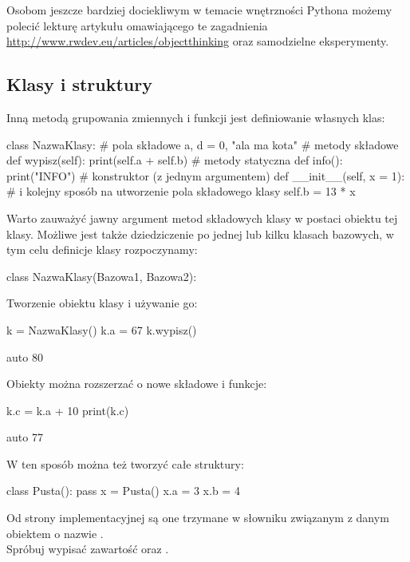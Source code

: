 \documentclass{pdfBooklets}
\begin{document}
Osobom jeszcze bardziej dociekliwym w temacie wnętrzności Pythona możemy polecić lekturę artykułu omawiającego te zagadnienia \url{http://www.rwdev.eu/articles/objectthinking} oraz samodzielne eksperymenty.

\subsection{Klasy i struktury {\Symbola 🤔}}

Inną metodą grupowania zmiennych i funkcji jest definiowanie własnych klas:
\begin{CodeFrame*}[python]{}
class NazwaKlasy:
  # pola składowe
  a, d = 0, "ala ma kota"
  # metody składowe
  def wypisz(self):
    print(self.a + self.b)
  # metody statyczna
  def info():
    print("INFO")
  # konstruktor (z jednym argumentem)
  def __init__(self, x = 1):
    # i kolejny sposób na utworzenie pola składowego klasy
    self.b = 13 * x
\end{CodeFrame*}
Warto zauważyć jawny argument metod składowych klasy w postaci obiektu tej klasy. 
Możliwe jest także dziedziczenie po jednej lub kilku klasach bazowych, w tym celu definicje klasy rozpoczynamy:
\begin{CodeFrame*}[python]{}
class NazwaKlasy(Bazowa1, Bazowa2):
\end{CodeFrame*}

Tworzenie obiektu klasy i używanie go:

\begin{CodeFrame}[python]{0.55\textwidth}
k = NazwaKlasy()
k.a = 67
k.wypisz()
\end{CodeFrame}
\begin{CodeFrame}{auto}
80
\end{CodeFrame}

Obiekty można rozszerzać o nowe składowe i funkcje:

\begin{CodeFrame}[python]{0.55\textwidth}
k.c = k.a + 10
print(k.c)
\end{CodeFrame}
\begin{CodeFrame}{auto}
77
\end{CodeFrame}

W ten sposób można też tworzyć całe struktury:\\
\begin{CodeFrame}[python]{0.55\textwidth}
class Pusta():
  pass
x = Pusta()
x.a = 3
x.b = 4
\end{CodeFrame}
\begin{minipage}[t]{0.4\textwidth}
\vspace{6pt}Od strony implementacyjnej są one trzymane w słowniku związanym z danym obiektem o nazwie .\\
Spróbuj wypisać zawartość  oraz .
\end{minipage}
\end{document}

